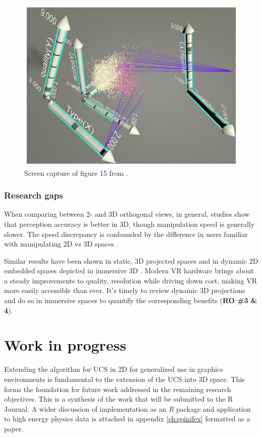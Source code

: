 \documentclass{monashthesis}
\begin{document}
\begin{figure}

{\centering \includegraphics[width=0.5\linewidth]{./figures/cordeil2017fig} 

}

\caption{Screen capture of figure 15 from \textcite{cordeil_imaxes:_2017}.}\label{fig:cordeil2017fig}
\end{figure}

\hypertarget{research-gaps-1}{%
\subsection{Research gaps}\label{research-gaps-1}}

When comparing between 2- and 3D orthogonal views, in general, studies show that perception accuracy is better in 3D, though manipulation speed is generally slower. The speed discrepancy is confounded by the difference in users familiar with manipulating 2D vs 3D spaces \autocites{lee_effects_1986,wickens_implications_1994,tory_visualization_2006}[counterexample][]{sedlmair_empirical_2013}.

Similar results have been shown in static, 3D projected spaces \autocite{gracia_new_2016,wagner_filho_immersive_2018} and in dynamic 2D embedded spaces depicted in immersive 3D \autocite{nelson_xgobi_1998}. Modern VR hardware brings about a steady improvements to quality, resolution while driving down cost, making VR more easily accessible than ever. It's timely to review dynamic 3D projections and do so in immersive spaces to quantify the corresponding benefits (\textbf{RO \#3 \& 4}).

\hypertarget{ch:workinprogress}{%
\chapter{Work in progress}\label{ch:workinprogress}}

Extending the algorithm for UCS in 2D for generalized use in graphics environments is fundamental to the extension of the UCS into 3D space. This forms the foundation for future work addressed in the remaining research objectives. This is a synthesis of the work that will be submitted to the R Journal. A wider discussion of implementation as an \emph{R} package and application to high energy physics data \autocite{wang_visualizing_2018,cook_dynamical_2018} is attached in appendix \ref{ch:spinifex} formatted as a paper.
\end{document}
